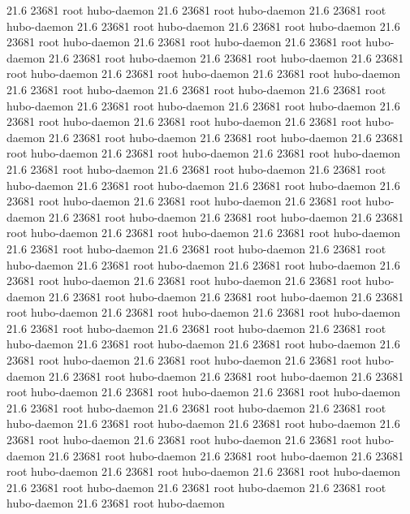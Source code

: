 21.6 23681 root     hubo-daemon
21.6 23681 root     hubo-daemon
21.6 23681 root     hubo-daemon
21.6 23681 root     hubo-daemon
21.6 23681 root     hubo-daemon
21.6 23681 root     hubo-daemon
21.6 23681 root     hubo-daemon
21.6 23681 root     hubo-daemon
21.6 23681 root     hubo-daemon
21.6 23681 root     hubo-daemon
21.6 23681 root     hubo-daemon
21.6 23681 root     hubo-daemon
21.6 23681 root     hubo-daemon
21.6 23681 root     hubo-daemon
21.6 23681 root     hubo-daemon
21.6 23681 root     hubo-daemon
21.6 23681 root     hubo-daemon
21.6 23681 root     hubo-daemon
21.6 23681 root     hubo-daemon
21.6 23681 root     hubo-daemon
21.6 23681 root     hubo-daemon
21.6 23681 root     hubo-daemon
21.6 23681 root     hubo-daemon
21.6 23681 root     hubo-daemon
21.6 23681 root     hubo-daemon
21.6 23681 root     hubo-daemon
21.6 23681 root     hubo-daemon
21.6 23681 root     hubo-daemon
21.6 23681 root     hubo-daemon
21.6 23681 root     hubo-daemon
21.6 23681 root     hubo-daemon
21.6 23681 root     hubo-daemon
21.6 23681 root     hubo-daemon
21.6 23681 root     hubo-daemon
21.6 23681 root     hubo-daemon
21.6 23681 root     hubo-daemon
21.6 23681 root     hubo-daemon
21.6 23681 root     hubo-daemon
21.6 23681 root     hubo-daemon
21.6 23681 root     hubo-daemon
21.6 23681 root     hubo-daemon
21.6 23681 root     hubo-daemon
21.6 23681 root     hubo-daemon
21.6 23681 root     hubo-daemon
21.6 23681 root     hubo-daemon
21.6 23681 root     hubo-daemon
21.6 23681 root     hubo-daemon
21.6 23681 root     hubo-daemon
21.6 23681 root     hubo-daemon
21.6 23681 root     hubo-daemon
21.6 23681 root     hubo-daemon
21.6 23681 root     hubo-daemon
21.6 23681 root     hubo-daemon
21.6 23681 root     hubo-daemon
21.6 23681 root     hubo-daemon
21.6 23681 root     hubo-daemon
21.6 23681 root     hubo-daemon
21.6 23681 root     hubo-daemon
21.6 23681 root     hubo-daemon
21.6 23681 root     hubo-daemon
21.6 23681 root     hubo-daemon
21.6 23681 root     hubo-daemon
21.6 23681 root     hubo-daemon
21.6 23681 root     hubo-daemon
21.6 23681 root     hubo-daemon
21.6 23681 root     hubo-daemon
21.6 23681 root     hubo-daemon
21.6 23681 root     hubo-daemon
21.6 23681 root     hubo-daemon
21.6 23681 root     hubo-daemon
21.6 23681 root     hubo-daemon
21.6 23681 root     hubo-daemon
21.6 23681 root     hubo-daemon
21.6 23681 root     hubo-daemon
21.6 23681 root     hubo-daemon
21.6 23681 root     hubo-daemon
21.6 23681 root     hubo-daemon
21.6 23681 root     hubo-daemon
21.6 23681 root     hubo-daemon
21.6 23681 root     hubo-daemon
21.6 23681 root     hubo-daemon
21.6 23681 root     hubo-daemon
